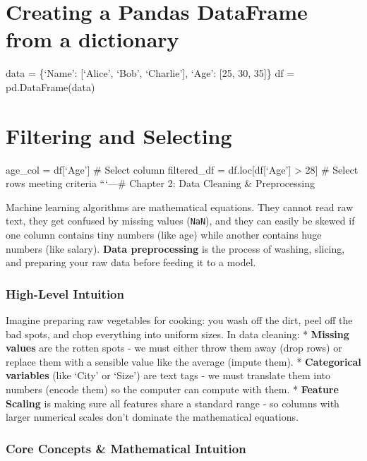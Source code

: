 \section{Creating a Pandas DataFrame from a
dictionary}\label{creating-a-pandas-dataframe-from-a-dictionary}

data = \{`Name': {[}`Alice', `Bob', `Charlie'{]}, `Age': {[}25, 30,
35{]}\} df = pd.DataFrame(data)

\section{Filtering and Selecting}\label{filtering-and-selecting}

age\_col = df{[}`Age'{]} \# Select column filtered\_df =
df.loc{[}df{[}`Age'{]} \textgreater{} 28{]} \# Select rows meeting
criteria ```\n\n---\n\n\# Chapter 2: Data Cleaning \& Preprocessing

Machine learning algorithms are mathematical equations. They cannot read
raw text, they get confused by missing values (\texttt{NaN}), and they
can easily be skewed if one column contains tiny numbers (like age)
while another contains huge numbers (like salary). \textbf{Data
preprocessing} is the process of washing, slicing, and preparing your
raw data before feeding it to a model.

\subsubsection{High-Level Intuition}\label{high-level-intuition-1}

Imagine preparing raw vegetables for cooking: you wash off the dirt,
peel off the bad spots, and chop everything into uniform sizes. In data
cleaning: * \textbf{Missing values} are the rotten spots - we must
either throw them away (drop rows) or replace them with a sensible value
like the average (impute them). * \textbf{Categorical variables} (like
`City' or `Size') are text tags - we must translate them into numbers
(encode them) so the computer can compute with them. * \textbf{Feature
Scaling} is making sure all features share a standard range - so columns
with larger numerical scales don't dominate the mathematical equations.

\subsubsection{Core Concepts \& Mathematical
Intuition}\label{core-concepts-mathematical-intuition-1}

